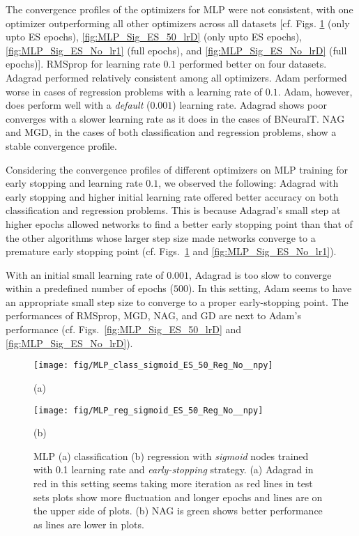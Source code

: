\documentclass[11pt,a4paper]{article}
\begin{document}
    The convergence profiles of the optimizers for MLP were not consistent, with one optimizer outperforming all other optimizers across  all datasets [cf. Figs. \ref{fig:MLP_Sig_ES_50_lr1} (only upto ES epochs),
    \ref{fig:MLP_Sig_ES_50_lrD} (only upto ES epochs), 
    \ref{fig:MLP_Sig_ES_No_lr1} (full epochs), and 
    \ref{fig:MLP_Sig_ES_No_lrD} (full epochs)].  
RMSprop for learning rate $0.1$ performed better on four datasets. Adagrad performed relatively consistent among all optimizers. Adam performed worse in cases of regression problems with a learning rate of $0.1$. Adam, however, does perform well with a \textit{default} ($0.001$) learning rate. Adagrad shows poor converges with a slower learning rate as it does in the cases of BNeuralT. NAG and MGD, in the cases of both classification and regression problems, show a stable convergence profile.
    
    Considering the convergence profiles of different optimizers on MLP training for early stopping and learning rate $0.1$, we observed the following: Adagrad with early stopping and higher initial learning rate offered better accuracy on both classification and regression problems. This is because Adagrad's small step at higher epochs allowed networks to find a better early stopping point than that of the other algorithms whose larger step size made networks converge to a premature early stopping point (cf. Figs.~\ref{fig:MLP_Sig_ES_50_lr1} and \ref{fig:MLP_Sig_ES_No_lr1}).
    
    With an initial small learning rate of $0.001$, Adagrad is too slow to converge within a predefined number of epochs ($500$). In this setting, Adam seems to have an  appropriate small step size to converge to a proper early-stopping point. The performances of RMSprop, MGD, NAG, and GD are next to Adam's performance (cf. Figs.~\ref{fig:MLP_Sig_ES_50_lrD} and \ref{fig:MLP_Sig_ES_No_lrD}).
    
    
\begin{figure}
        \centering
        \texttt{[image: fig/MLP\_class\_sigmoid\_ES\_50\_Reg\_No\_\_npy]}


        (a)
        
        \centering
        \texttt{[image: fig/MLP\_reg\_sigmoid\_ES\_50\_Reg\_No\_\_npy]}
        
        (b)
        \caption{MLP (a) classification (b) regression with \textit{sigmoid} nodes trained with 0.1 learning rate and \textit{early-stopping} strategy. (a) Adagrad in red in this setting seems taking more iteration as red lines in test sets plots show more fluctuation and longer epochs and lines are on the upper side of plots. (b) NAG is green shows better performance as lines are lower in plots.
        \label{fig:MLP_Sig_ES_50_lr1}}
    \end{figure}
    
\end{document}
